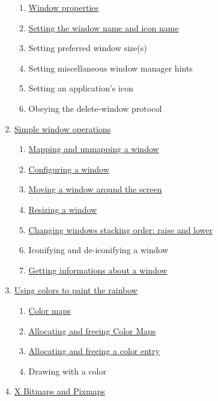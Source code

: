 \documentclass[12pt,oneside,titlepage]{book}
\providecommand{\tightlist}{%
  \setlength{\itemsep}{0pt}\setlength{\parskip}{0pt}}
\begin{document}
\begin{enumerate}
  \begin{enumerate}
  \tightlist
  \item
    \protect\hyperlink{wmprop}{Window properties}
  \item
    \protect\hyperlink{wmname}{Setting the window name and icon name}
  \item
    Setting preferred window size(s)
  \item
    Setting miscellaneous window manager hints
  \item
    Setting an application's icon
  \item
    Obeying the delete-window protocol
  \end{enumerate}
\item
  \protect\hyperlink{winop}{Simple window operations}

  \begin{enumerate}
  \tightlist
  \item
    \protect\hyperlink{winmap}{Mapping and unmapping a window}
  \item
    \protect\hyperlink{winconf}{Configuring a window}
  \item
    \protect\hyperlink{winmove}{Moving a window around the screen}
  \item
    \protect\hyperlink{winsize}{Resizing a window}
  \item
    \protect\hyperlink{winstack}{Changing windows stacking order: raise
    and lower}
  \item
    Iconifying and de-iconifying a window
  \item
    \protect\hyperlink{wingetinfo}{Getting informations about a window}
  \end{enumerate}
\item
  \protect\hyperlink{usecolor}{Using colors to paint the rainbow}

  \begin{enumerate}
  \tightlist
  \item
    \protect\hyperlink{colormap}{Color maps}
  \item
    \protect\hyperlink{colormapalloc}{Allocating and freeing Color Maps}
  \item
    \protect\hyperlink{alloccolor}{Allocating and freeing a color entry}
  \item
    Drawing with a color
  \end{enumerate}
\item
  \protect\hyperlink{pixmaps}{X Bitmaps and Pixmaps}


\end{enumerate}
\end{document}
